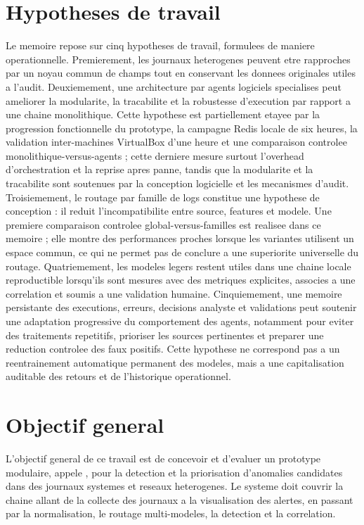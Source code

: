 \section{Hypotheses de travail}
Le memoire repose sur cinq hypotheses de travail, formulees de maniere operationnelle. Premierement, les journaux heterogenes peuvent etre rapproches par un noyau commun de champs tout en conservant les donnees originales utiles a l'audit. Deuxiemement, une architecture par agents logiciels specialises peut ameliorer la modularite, la tracabilite et la robustesse d'execution par rapport a une chaine monolithique. Cette hypothese est partiellement etayee par la progression fonctionnelle du prototype, la campagne Redis locale de six heures, la validation inter-machines VirtualBox d'une heure et une comparaison controlee monolithique-versus-agents ; cette derniere mesure surtout l'overhead d'orchestration et la reprise apres panne, tandis que la modularite et la tracabilite sont soutenues par la conception logicielle et les mecanismes d'audit. Troisiemement, le routage par famille de logs constitue une hypothese de conception : il reduit l'incompatibilite entre source, features et modele. Une premiere comparaison controlee global-versus-familles est realisee dans ce memoire ; elle montre des performances proches lorsque les variantes utilisent un espace commun, ce qui ne permet pas de conclure a une superiorite universelle du routage. Quatriemement, les modeles legers restent utiles dans une chaine locale reproductible lorsqu'ils sont mesures avec des metriques explicites, associes a une correlation et soumis a une validation humaine. Cinquiemement, une memoire persistante des executions, erreurs, decisions analyste et validations peut soutenir une adaptation progressive du comportement des agents, notamment pour eviter des traitements repetitifs, prioriser les sources pertinentes et preparer une reduction controlee des faux positifs. Cette hypothese ne correspond pas a un reentrainement automatique permanent des modeles, mais a une capitalisation auditable des retours et de l'historique operationnel.

\section{Objectif general}
L'objectif general de ce travail est de concevoir et d'evaluer un prototype modulaire, appele \logminer, pour la detection et la priorisation d'anomalies candidates dans des journaux systemes et reseaux heterogenes. Le systeme doit couvrir la chaine allant de la collecte des journaux a la visualisation des alertes, en passant par la normalisation, le routage multi-modeles, la detection et la correlation.

